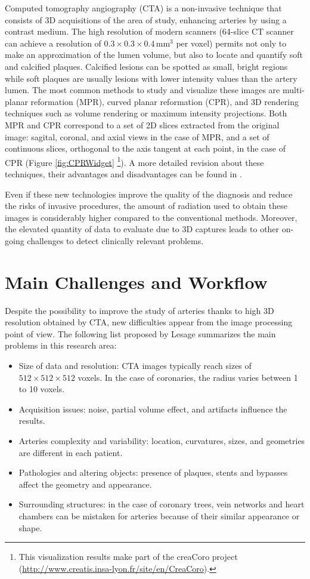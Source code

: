 Computed tomography angiography (CTA) is a non-invasive technique that consists of 3D acquisitions of the area of study, enhancing arteries by using a contrast medium. The high resolution of modern scanners (64-slice CT scanner can achieve a resolution of $0.3 \times 0.3 \times 0.4${\,}mm$^3$ per voxel) permits not only to make an approximation of the lumen volume, but also to locate and quantify soft and calcified plaques. Calcified lesions can be spotted as small, bright regions while soft plaques are usually lesions with lower intensity values than the artery lumen. The most common methods to study and visualize these images are multi-planar reformation (MPR), curved planar reformation (CPR), and 3D rendering techniques such as volume rendering or maximum intensity projections. Both MPR and CPR correspond to a set of 2D slices extracted from the original image: sagital, coronal, and axial views in the case of MPR, and a set of continuous slices, orthogonal to the axis tangent at each point, in the case of CPR (Figure \ref{fig:CPRWidget} \footnote{This visualization results make part of the creaCoro project (\href{http://www.creatis.insa-lyon.fr/site/en/CreaCoro}{http://www.creatis.insa-lyon.fr/site/en/CreaCoro}).}). A more detailed revision about these techniques, their advantages and disadvantages can be found in \citep{Wang2011Thesis}.

Even if these new technologies improve the quality of the diagnosis and reduce the risks of invasive procedures, the amount of radiation used to obtain these images is considerably higher compared to the conventional methods. Moreover, the elevated quantity of data to evaluate due to 3D captures leads to other on-going challenges to detect clinically relevant problems.


\section{Main Challenges and Workflow}
%
Despite the possibility to improve the study of arteries thanks to high 3D resolution obtained by CTA, new difficulties appear from the image processing point of view. The following list proposed by Lesage \citep{Lesage2009Thesis} summarizes the main problems in this research area:

\begin{itemize}
	\item Size of data and resolution: CTA images typically reach sizes of $512\times512\times512$ voxels. In the case of coronaries, the radius varies between 1 to 10 voxels.	
	\item Acquisition issues: noise, partial volume effect, and artifacts influence the results.	
	\item Arteries complexity and variability: location, curvatures, sizes, and geometries are different in each patient.
	\item Pathologies and altering objects: presence of plaques, stents and bypasses affect the geometry and appearance.
	\item Surrounding structures: in the case of coronary trees, vein networks and heart chambers can be mistaken for arteries because of their similar appearance or shape. 
\end{itemize}

